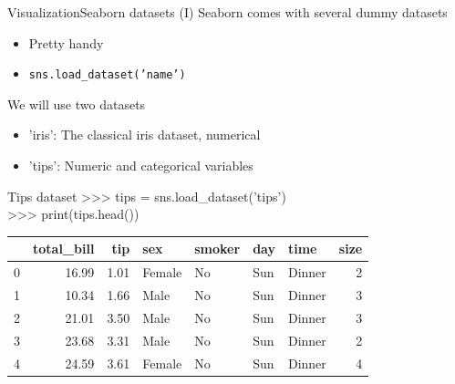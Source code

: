 \documentclass[10pt,compress]{beamer} %
\begin{document}
\begin{frame}[fragile]{Visualization}{Seaborn datasets (I)}
	Seaborn comes with several dummy datasets
	\begin{itemize}
		\item Pretty handy
		\item \texttt{sns.load\_dataset('name')}
	\end{itemize}
	We will use two datasets
	\begin{itemize}
		\item 'iris': The classical iris dataset, numerical
		\item 'tips': Numeric and categorical variables
	\end{itemize}

	\footnotesize{
	\begin{exampleblock}{\footnotesize{Tips dataset}}
	>>> tips = sns.load\_dataset('tips')\\
	>>> print(tips.head())\\
	\begin{tabular}{lrrllllr}
		\hline
		{} &  total\_bill &   tip &     sex & smoker &  day &    time &  size \\
		\hline
		0 &       16.99 &  1.01 &  Female &     No &  Sun &  Dinner &     2 \\
		1 &       10.34 &  1.66 &    Male &     No &  Sun &  Dinner &     3 \\
		2 &       21.01 &  3.50 &    Male &     No &  Sun &  Dinner &     3 \\
		3 &       23.68 &  3.31 &    Male &     No &  Sun &  Dinner &     2 \\
		4 &       24.59 &  3.61 &  Female &     No &  Sun &  Dinner &     4 \\
		\hline
	\end{tabular}
	\end{exampleblock}
	}
\end{frame}
\end{document}
